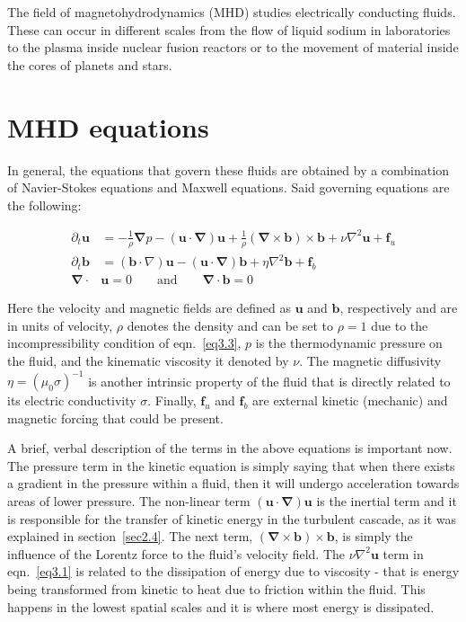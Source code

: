 \documentclass[12pt,a4paper]{report}
\begin{document}
The field of magnetohydrodynamics (MHD) studies electrically conducting fluids. These can occur in different scales from the flow of liquid sodium in laboratories to the plasma inside nuclear fusion reactors or to the movement of material inside the cores of planets and stars. 

\section{MHD equations}

In general, the equations that govern these fluids are obtained by a combination of Navier-Stokes equations and Maxwell equations. Said governing equations are the following:

\begin{align}
\partial_t \bm u &= - \frac{1}{\rho} \bm \nabla p - (\bm u \cdot \bm \nabla) \bm u + \frac{1}{\rho} (\bm \nabla \times \bm b) \times \bm b + \nu \nabla^2 \bm u + \bm f_u \label{eq3.1} \\
\partial_t \bm b &= (\bm b \cdot \nabla) \bm u - (\bm u \cdot \bm \nabla) \bm b + \eta \nabla^2 \bm b + \bm f_b \label{eq3.2} \\
\bm \nabla \cdot &\bm u = 0 \qquad \text{and} \qquad \bm \nabla \cdot \bm b = 0 \label{eq3.3}
\end{align}

Here the velocity and magnetic fields are defined as $\bm u$ and $\bm b$, respectively and are in units of velocity, $\rho$ denotes the density and can be set to $\rho = 1$ due to the incompressibility condition of eqn.~\ref{eq3.3}, $p$ is the thermodynamic pressure on the fluid, and the kinematic viscosity it denoted by $\nu$. The magnetic diffusivity $\eta=(\mu_0\sigma)^{-1}$ is another intrinsic property of the fluid that is directly related to its electric conductivity $\sigma$. Finally, $\bm f_u$ and $\bm f_b$ are external kinetic (mechanic) and magnetic forcing that could be present. 

A brief, verbal description of the terms in the above equations is important now. The pressure term in the kinetic equation is simply saying that when there exists a gradient in the pressure within a fluid, then it will undergo acceleration towards areas of lower pressure. The non-linear term $(\bm u \cdot \bm \nabla)\bm u$ is the inertial term and it is responsible for the transfer of kinetic energy in the turbulent cascade, as it was explained in section~\ref{sec2.4}. The next term, $(\bm \nabla \times \bm b) \times \bm b$, is simply the influence of the Lorentz force to the fluid's velocity field. The $\nu \nabla^2 \bm u$ term in eqn.~\ref{eq3.1} is related to the dissipation of energy due to viscosity - that is energy being transformed from kinetic to heat due to friction  within the fluid. This happens in the lowest spatial scales and it is where most energy is dissipated.
\end{document}
